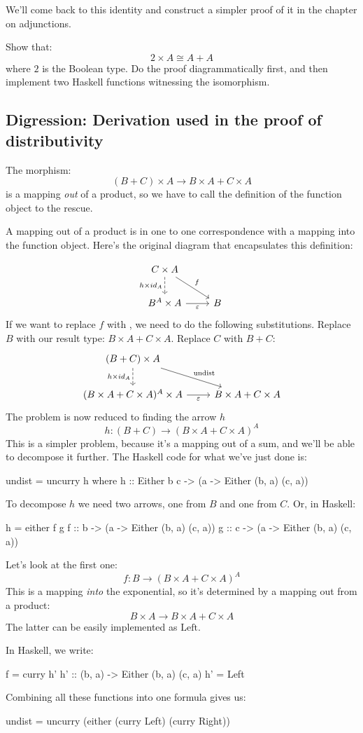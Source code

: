 \documentclass[DaoFP]{subfiles}
\begin{document}
We'll come back to this identity and construct a simpler proof of it in the chapter on adjunctions.

\begin{exercise}
Show that:
\[ 2 \times A \cong A + A \]
where $2$ is the Boolean type. Do the proof diagrammatically first, and then implement two Haskell functions witnessing the isomorphism.
\end{exercise}

\subsection{Digression: Derivation used in the proof of distributivity}

The morphism:
\[(B + C) \times A \to B \times A + C \times A\]
is a mapping \emph{out} of a product, so we have to call the definition of the function object to the rescue.  

A mapping out of a product is in one to one correspondence with a mapping into the function object. Here's the original diagram that encapsulates this definition:

\[
 \begin{tikzcd}
 C \times A
 \arrow[d, dashed, "h \times id_A"']
 \arrow[rd, "f"]
 \\
 B^A \times A
 \arrow[r, "\varepsilon"']
& B
 \end{tikzcd}
\]
If we want to replace $f$ with , we need to do the following substitutions. Replace $B$ with our result type: $B \times A + C \times A$. Replace $C$ with $B + C$:
\[
 \begin{tikzcd}
 (B+C) \times A
 \arrow[d, dashed, "h \times id_A"']
 \arrow[rd, "\text{undist}"]
 \\
 (B \times A + C \times A)^A \times A
 \arrow[r, "\varepsilon"']
& B \times A + C \times A
 \end{tikzcd}
\]
The problem is now reduced to finding the arrow $h$
\[ h \colon (B + C) \to  (B \times A + C \times A)^A \]
This is a simpler problem, because it's a mapping out of a sum, and we'll be able to decompose it further. The Haskell code for what we've just done is:
\begin{haskell}
undist = uncurry h
  where
    h :: Either b c -> (a -> Either (b, a) (c, a))
\end{haskell}
To decompose $h$ we need two arrows, one from $B$ and one from $C$. Or, in Haskell:

\begin{haskell}
    h = either f g
    f :: b -> (a -> Either (b, a) (c, a))
    g :: c -> (a -> Either (b, a) (c, a))
\end{haskell}
Let's look at the first one:
\[f \colon B \to (B \times A + C \times A)^A \]
This is a mapping \emph{into} the exponential, so it's determined by a mapping out from a product:
\[ B \times A \to B \times A + C \times A \]
The latter can be easily implemented as $\text{Left}$.

In Haskell, we write:
\begin{haskell}
    f = curry h'
    h' :: (b, a) -> Either (b, a) (c, a)
    h'  = Left
\end{haskell}

Combining all these functions into one formula gives us:
\begin{haskell}
undist = uncurry (either (curry Left) (curry Right))
\end{haskell}
\end{document}

